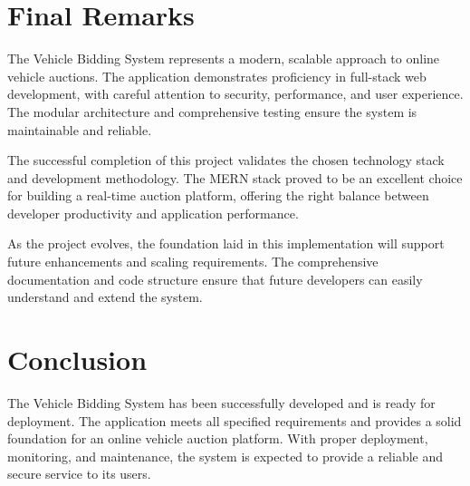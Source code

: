 \section{Final Remarks}

The Vehicle Bidding System represents a modern, scalable approach to online vehicle auctions. The application demonstrates proficiency in full-stack web development, with careful attention to security, performance, and user experience. The modular architecture and comprehensive testing ensure the system is maintainable and reliable.

The successful completion of this project validates the chosen technology stack and development methodology. The MERN stack proved to be an excellent choice for building a real-time auction platform, offering the right balance between developer productivity and application performance.

As the project evolves, the foundation laid in this implementation will support future enhancements and scaling requirements. The comprehensive documentation and code structure ensure that future developers can easily understand and extend the system.

\section{Conclusion}

The Vehicle Bidding System has been successfully developed and is ready for deployment. The application meets all specified requirements and provides a solid foundation for an online vehicle auction platform. With proper deployment, monitoring, and maintenance, the system is expected to provide a reliable and secure service to its users.

